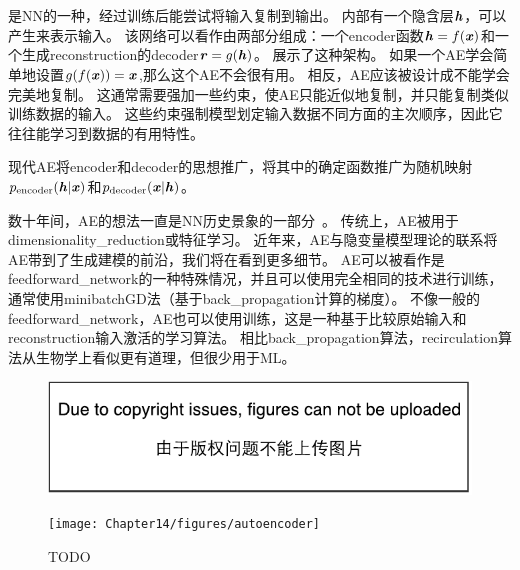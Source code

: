 \chapter{}
\label{chap:autoencoders}
是\gls{NN}的一种，经过训练后能尝试将输入复制到输出。
内部有一个隐含层$\boldsymbol{\mathit{h}}$，可以产生来表示输入。
该网络可以看作由两部分组成：一个\gls{encoder}函数$ \boldsymbol{\mathit{h}} = f(\boldsymbol{\mathit{x}})$和一个生成\gls{reconstruction}的\gls{decoder}$\boldsymbol{\mathit{r}}=g(\boldsymbol{\mathit{h}})$。
展示了这种架构。
如果一个\gls{AE}学会简单地设置$g(f(\boldsymbol{\mathit{x}})) =\boldsymbol{\mathit{x}}$,那么这个\gls{AE}不会很有用。
相反，\gls{AE}应该被设计成不能学会完美地复制。
这通常需要强加一些约束，使\gls{AE}只能近似地复制，并只能复制类似训练数据的输入。
这些约束强制模型划定输入数据不同方面的主次顺序，因此它往往能学习到数据的有用特性。


现代\gls{AE}将\gls{encoder}和\gls{decoder}的思想推广，将其中的确定函数推广为随机映射$p_{\text{encoder}} (\boldsymbol{\mathit{h}} | \boldsymbol{\mathit{x}})$和$p_{\text{decoder}}(\boldsymbol{\mathit{x}} | \boldsymbol{\mathit{h}})$。


数十年间，\gls{AE}的想法一直是\gls{NN}历史景象的一部分~\citep{Lecun-these87,Bourlard88,hinton1994amd-small}。
传统上，\gls{AE}被用于\gls{dimensionality_reduction}或特征学习。
近年来，\gls{AE}与隐变量模型理论的联系将\gls{AE}带到了生成建模的前沿，我们将在看到更多细节。
\gls{AE}可以被看作是\gls{feedforward_network}的一种特殊情况，并且可以使用完全相同的技术进行训练，通常使用\gls{minibatch}\gls{GD}法（基于\gls{back_propagation}计算的梯度）。
不像一般的\gls{feedforward_network}，\gls{AE}也可以使用训练\citep{Hinton+McClelland-NIPS1987}，这是一种基于比较原始输入和\gls{reconstruction}输入激活的学习算法。
相比\gls{back_propagation}算法，\gls{recirculation}算法从生物学上看似更有道理，但很少用于\gls{ML}。

\begin{figure}[!htb]
\ifOpenSource
\centerline{\includegraphics{figure.pdf}}
\else
\centerline{\texttt{[image: Chapter14/figures/autoencoder]}}
\fi
\caption{TODO}
\label{fig:chap14_autoencoder}
\end{figure}

